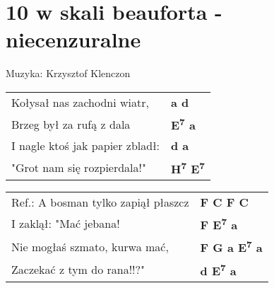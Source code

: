 \section{10 w skali beauforta - niecenzuralne}

Muzyka: Krzysztof Klenczon\\

\vspace{2em}
\begin{tabular}{@{}p{7cm}@{}l@{}}
Kołysał nas zachodni wiatr, & \bfseries  a d \\
Brzeg był za rufą z dala & \bfseries  E\textsuperscript{7} a \\
I nagle ktoś jak papier zbladł:  & \bfseries  d a \\
"Grot nam się rozpierdala!" & \bfseries  H\textsuperscript{7} E\textsuperscript{7} \\
\end{tabular}

\vspace{1em}
\begin{tabular}{@{}p{7cm}@{}l@{}}
Ref.: A bosman tylko zapiął płaszcz & \bfseries  F C F C \\
I zaklął: "Mać jebana! & \bfseries  F E\textsuperscript{7} a \\
Nie mogłaś szmato, kurwa mać, & \bfseries  F G a E\textsuperscript{7} a \\
Zaczekać z tym do rana!!?" & \bfseries  d E\textsuperscript{7} a \\
\end{tabular}

